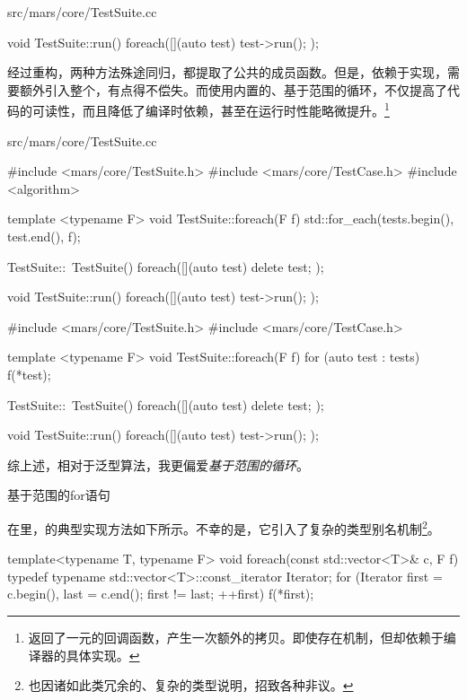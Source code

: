 \begin{content}
\begin{nodiff}{src/mars/core/TestSuite.cc}
\begin{c++}
void TestSuite::run() {
  foreach([](auto test){
    test->run();
  });
}
 \end{c++}
\end{nodiff}

经过重构，两种方法殊途同归，都提取了公共的成员函数。但是，依赖于实现，需要额外引入整个，有点得不偿失。而使用内置的、基于范围的循环，不仅提高了代码的可读性，而且降低了编译时依赖，甚至在运行时性能略微提升。\footnote{返回了一元的回调函数，产生一次额外的拷贝。即使存在机制，但却依赖于编译器的具体实现。}

\begin{diff}{src/mars/core/TestSuite.cc}
 \begin{minicpp}
#include <mars/core/TestSuite.h>
#include <mars/core/TestCase.h>
#include <algorithm>

template <typename F>
void TestSuite::foreach(F f) {
  std::for_each(tests.begin(), test.end(), f);
}

TestSuite::~TestSuite() {
  foreach([](auto test){
    delete test;
  });
}

void TestSuite::run() {
  foreach([](auto test){
    test->run();
  });
}
 \end{minicpp}
\tcblower
 \begin{minicpp}
#include <mars/core/TestSuite.h>
#include <mars/core/TestCase.h>

template <typename F>
void TestSuite::foreach(F f) {
  for (auto test : tests) {
    f(*test);
  }
}

TestSuite::~TestSuite() {
  foreach([](auto test) {
    delete test;
  });
}

void TestSuite::run() {
  foreach([](auto test){
    test->run();
  });
}
 \end{minicpp}
\end{diff}

综上述，相对于泛型算法，我更偏爱\emph{基于范围的循环}。

\begin{episode}{基于范围的for语句}
\begin{content}

在里，的典型实现方法如下所示。不幸的是，它引入了复杂的类型别名机制\footnote{\cpp{}也因诸如此类冗余的、复杂的类型说明，招致各种非议。}。

 \begin{c++}[title={\ttfamily{实现foreach：应用for循环，C++98}}]
template<typename T, typename F>
void foreach(const std::vector<T>& c, F f) {
  typedef typename std::vector<T>::const_iterator Iterator;
  for (Iterator first = c.begin(), last = c.end(); first != last; ++first) {
    f(*first);
  }
}
 \end{c++}


\end{content}
\end{episode}
\end{content}
